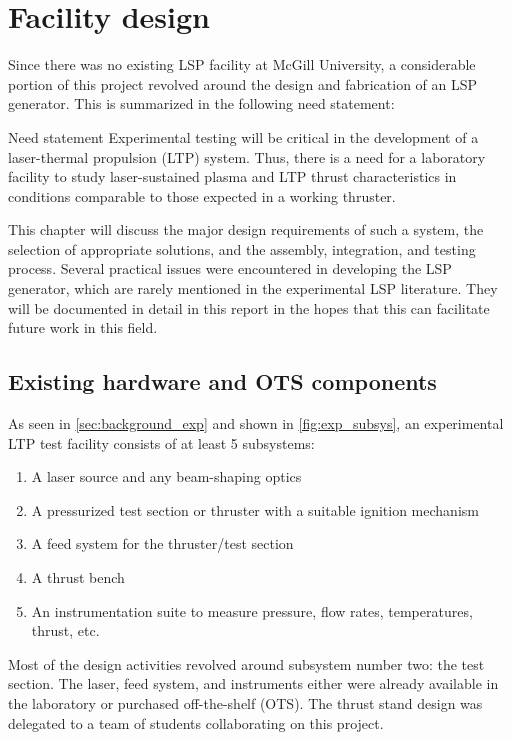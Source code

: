 \chapter{Facility design}
    Since there was no existing LSP facility at McGill University, a considerable portion of this project revolved around the design and fabrication of an LSP generator. This is summarized in the following need statement:

    \begin{statement}{Need statement} 
        Experimental testing will be critical in the development of a laser-thermal propulsion (LTP) system. Thus, there is a need for a laboratory facility to study laser-sustained plasma and LTP thrust characteristics in conditions comparable to those expected in a working thruster.
    \end{statement}
    
    This chapter will discuss the major design requirements of such a system, the selection of appropriate solutions, and the assembly, integration, and testing process. Several practical issues were encountered in developing the LSP generator, which are rarely mentioned in the experimental LSP literature. They will be documented in detail in this report in the hopes that this can facilitate future work in this field.

    \section{Existing hardware and OTS components} \label{sec:design_ots}
        As seen in \autoref{sec:background_exp} and shown in \autoref{fig:exp_subsys}, an experimental LTP test facility consists of at least 5 subsystems:
        \begin{enumerate}
            \item A laser source and any beam-shaping optics
            \item A pressurized test section or thruster with a suitable ignition mechanism
            \item A feed system for the thruster/test section
            \item A thrust bench
            \item An instrumentation suite to measure pressure, flow rates, temperatures, thrust, etc.
        \end{enumerate}

        Most of the design activities revolved around subsystem number two: the test section. The laser, feed system, and instruments either were already available in the laboratory or purchased off-the-shelf (OTS). The thrust stand design was delegated to a team of students collaborating on this project.


